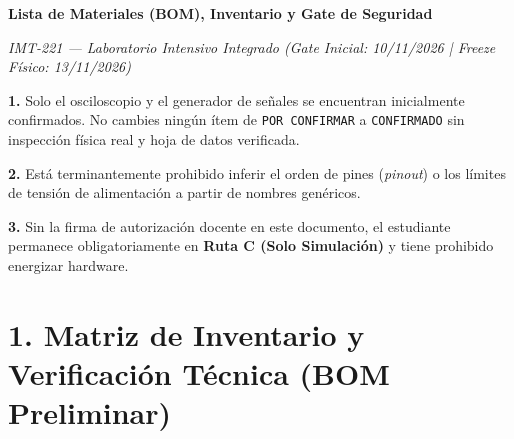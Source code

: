 \documentclass[11pt, a4paper]{article}
\begin{document}
\begin{center}
    {\Large \textbf{Lista de Materiales (BOM), Inventario y Gate de Seguridad}}
    \par\vspace{0.15cm}
    \textit{IMT-221 — Laboratorio Intensivo Integrado (Gate Inicial: 10/11/2026 | Freeze Físico: 13/11/2026)}
\end{center}

\begin{tcolorbox}[colback=red!5, colframe=red!80!black, title=\textbf{Regla Estricta de Seguridad y Prohibición de Suposiciones}]
    \textbf{1.} Solo el osciloscopio y el generador de señales se encuentran inicialmente confirmados. No cambies ningún ítem de \texttt{POR CONFIRMAR} a \texttt{CONFIRMADO} sin inspección física real y hoja de datos verificada.
    \par\vspace{0.1cm}
    \textbf{2.} Está terminantemente prohibido inferir el orden de pines (\textit{pinout}) o los límites de tensión de alimentación a partir de nombres genéricos.
    \par\vspace{0.1cm}
    \textbf{3.} Sin la firma de autorización docente en este documento, el estudiante permanece obligatoriamente en \textbf{Ruta C (Solo Simulación)} y tiene prohibido energizar hardware.
\end{tcolorbox}

\section*{1. Matriz de Inventario y Verificación Técnica (BOM Preliminar)}
\end{document}
